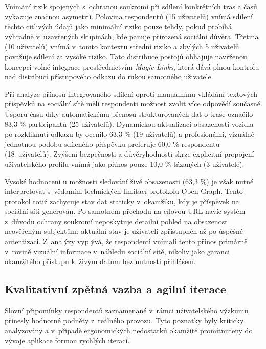 \documentclass[male,czech,api_bc]{kitheses}
\begin{document}
Vnímání rizik spojených s~ochranou soukromí při sdílení konkrétních tras a časů vykazuje značnou asymetrii. Polovina respondentů (15 uživatelů) vnímá sdílení těchto citlivých údajů jako minimální riziko pouze tehdy, pokud probíhá výhradně v~uzavřených skupinách, kde panuje přirozená sociální důvěra. Třetina (10 uživatelů) vnímá v~tomto kontextu střední riziko a zbylých 5 uživatelů považuje sdílení za vysoké riziko. Tato distribuce postojů obhajuje navrženou koncepci volné integrace prostřednictvím \textit{Magic Links}, která dává plnou kontrolu nad distribucí přístupového odkazu do rukou samotného uživatele.

Při analýze přínosů integrovaného sdílení oproti manuálnímu vkládání textových příspěvků na sociální sítě měli respondenti možnost zvolit více odpovědí současně. Úsporu času díky automatickému přenosu strukturovaných dat o trase označilo 83,3 \% participantů (25 uživatelů). Dynamickou aktualizaci obsazenosti vozidla po rozkliknutí odkazu by ocenilo 63,3 \% (19 uživatelů) a profesionální, vizuálně jednotnou podobu sdíleného příspěvku preferuje 60,0 \% respondentů (18~uživatelů). Zvýšení bezpečnosti a důvěryhodnosti skrze explicitní propojení uživatelského profilu vnímá jako přínos pouze 10,0 \% tázaných (3 uživatelé).

Vysoké hodnocení u možnosti sledování živé obsazenosti (63,3 \%) je však nutné interpretovat s~vědomím technických limitací protokolu Open Graph. Tento protokol totiž zachycuje stav dat staticky v~okamžiku, kdy je příspěvek na sociální síti generován. Po samotném přechodu na cílovou URL navíc systém z~důvodu ochrany soukromí neposkytuje detailní pohled na obsazenost neověřeným subjektům; aktuální stav je uživateli zpřístupněn až po úspěšné autentizaci. Z~analýzy vyplývá, že respondenti vnímali tento přínos primárně v~rovině vizuální informace v~náhledu sociální sítě, nikoliv jako garanci okamžitého přístupu k~živým datům bez nutnosti přihlášení.

\subsection{Kvalitativní zpětná vazba a agilní iterace}
\label{subsec:kvalitativni_vazba}

Slovní připomínky respondentů zaznamenané v~rámci uživatelského výzkumu přinesly hodnotné podněty z~reálného provozu. Tyto poznatky byly kriticky analyzovány a v~případě ergonomických nedostatků okamžitě promítnuteny do vývoje aplikace formou rychlých iterací.
\end{document}
